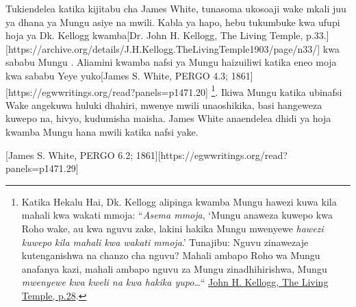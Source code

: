 Tukiendelea katika kijitabu cha James White, tunasoma ukosoaji wake mkali juu ya dhana ya Mungu asiye na mwili. Kabla ya hapo, hebu tukumbuke kwa ufupi hoja ya Dk. Kellogg kwamba[Dr. John H. Kellogg, The Living Temple, p.33.][https://archive.org/details/J.H.Kellogg.TheLivingTemple1903/page/n33/] kwa sababu Mungu . Aliamini kwamba nafsi ya Mungu haizuiliwi katika eneo moja kwa sababu Yeye yuko[James S. White, PERGO 4.3; 1861][https://egwwritings.org/read?panels=p1471.20] \footnote{Katika Hekalu Hai, Dk. Kellogg alipinga kwamba Mungu hawezi kuwa kila mahali kwa wakati mmoja: “\textit{Asema mmoja}, ‘Mungu anaweza kuwepo kwa Roho wake, au kwa nguvu zake, lakini hakika Mungu mwenyewe \textit{hawezi kuwepo kila mahali kwa wakati mmoja}.’ Tunajibu: Nguvu zinawezaje kutenganishwa na chanzo cha nguvu? Mahali ambapo Roho wa Mungu anafanya kazi, mahali ambapo nguvu za Mungu zinadhihirishwa, Mungu \textit{mwenyewe kwa kweli na kwa hakika yupo}…“ \href{https://archive.org/details/J.H.Kellogg.TheLivingTemple1903/page/n29/}{John H. Kellogg, The Living Temple, p.28}.}. Ikiwa Mungu katika ubinafsi Wake angekuwa huluki dhahiri, mwenye mwili unaoshikika, basi hangeweza kuwepo na, hivyo, kudumisha maisha. James White anaendelea dhidi ya hoja kwamba Mungu hana mwili katika nafsi yake.


[James S. White, PERGO 6.2; 1861][https://egwwritings.org/read?panels=p1471.29]

